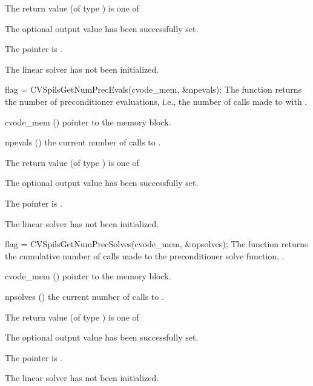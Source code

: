 {
  The return value  (of type ) is one of
  \begin{args}
  \item[\Id{CVSPILS\_SUCCESS}] 
    The optional output value has been successfully set.
  \item[\Id{CVSPILS\_MEM\_NULL}]
    The  pointer is .
  \item[\Id{CVSPILS\_LMEM\_NULL}]
    The {\cvspils} linear solver has not been initialized.
  \end{args}
}
{}
{
  flag = CVSpilsGetNumPrecEvals(cvode\_mem, \&npevals);
}
{
  The function  returns the
  number of preconditioner evaluations, i.e., the number of 
  calls made to  with .
}
{
  \begin{args}
  \item[cvode\_mem] ()
    pointer to the {\cvodes} memory block.
  \item[npevals] ()
    the current number of calls to .
  \end{args}
}
{
  The return value  (of type ) is one of
  \begin{args}
  \item[\Id{CVSPILS\_SUCCESS}] 
    The optional output value has been successfully set.
  \item[\Id{CVSPILS\_MEM\_NULL}]
    The  pointer is .
  \item[\Id{CVSPILS\_LMEM\_NULL}]
    The {\cvspils} linear solver has not been initialized.
  \end{args}
}
{}
{
  flag = CVSpilsGetNumPrecSolves(cvode\_mem, \&npsolves);
}
{
  The function  returns the
  cumulative number of calls made to the preconditioner 
  solve function, .
}
{
  \begin{args}
  \item[cvode\_mem] ()
    pointer to the {\cvodes} memory block.
  \item[npsolves] ()
    the current number of calls to .
  \end{args}
}
{
  The return value  (of type ) is one of
  \begin{args}
  \item[\Id{CVSPILS\_SUCCESS}] 
    The optional output value has been successfully set.
  \item[\Id{CVSPILS\_MEM\_NULL}]
    The  pointer is .
  \item[\Id{CVSPILS\_LMEM\_NULL}]
    The {\cvspils} linear solver has not been initialized.
  \end{args}
}
